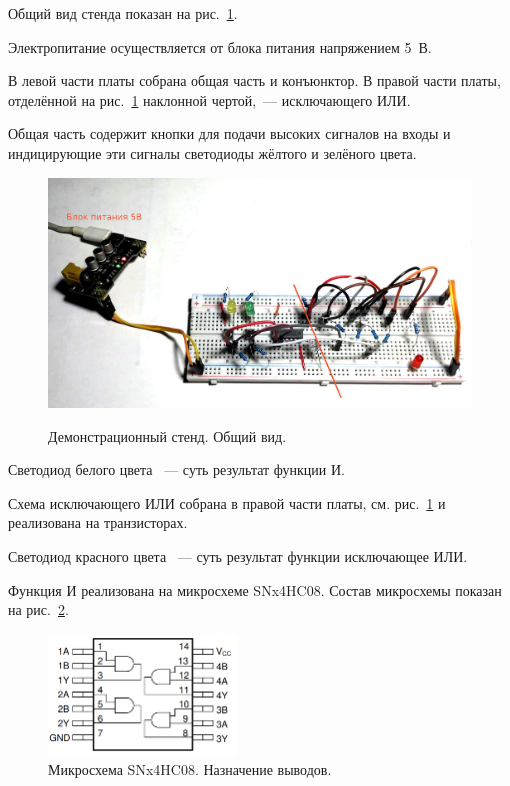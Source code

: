 \documentclass[a4paper,12pt]{article}
\begin{document}
Общий вид стенда показан на рис.~\ref{general_view}.

Электропитание осуществляется от блока питания напряжением 5~В.

В левой части платы собрана общая часть и конъюнктор. В правой части платы, отделённой на рис.~\ref{general_view} наклонной чертой,~--- исключающего ИЛИ. 

Общая часть содержит кнопки для подачи высоких сигналов на входы и индицирующие эти сигналы светодиоды жёлтого и зелёного цвета.

\begin{figure}[h]
    \begin{center}
    \label{general_view}
    \includegraphics[width=\textwidth]{general_view}    
    \caption{Демонстрационный стенд. Общий вид.}
    \end{center}
\end{figure}

Светодиод белого цвета ~--- суть результат функции И.

Схема исключающего ИЛИ собрана в правой части платы, см. рис.~\ref{general_view} и реализована на транзисторах.

Светодиод красного цвета ~--- суть результат функции исключающее ИЛИ.

Функция И реализована на микросхеме SNx4HC08. Состав микросхемы показан на рис.~\ref{SNx4HC08}.

\begin{figure}[h]
    \begin{center}
    \includegraphics[width=5cm]{SNx4HC08}    
    \caption{Микросхема SNx4HC08. Назначение выводов.}
    \label{SNx4HC08}
    \end{center}
\end{figure}
\end{document}
